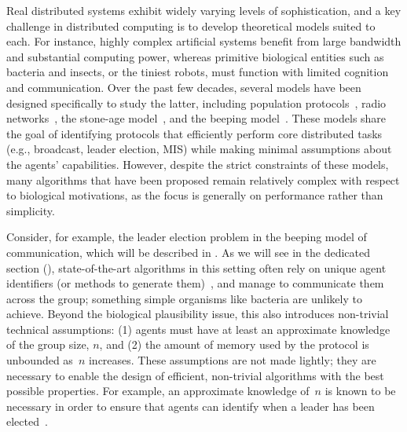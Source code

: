 \documentclass{article}
\newcommand{\inote}[1]{{\color{blue} ({\bf Isa:} #1)}}
\begin{document}
Real distributed systems exhibit widely varying levels of sophistication, and a key challenge in distributed computing is to develop theoretical models suited to each.
For instance, highly complex artificial systems benefit from large bandwidth and substantial computing power, whereas primitive biological entities such as bacteria and insects, or the tiniest robots, must function with limited cognition and communication. Over the past few decades, several models have been designed specifically to study the latter, including population protocols~\cite{AspnesR09}, radio networks~\cite{chlamtac_broadcasting_1985}, the stone-age model~\cite{emek_stone_2013}, and the beeping model~\cite{CornejoK10}. These models share the goal of identifying protocols that efficiently perform core distributed tasks (e.g., broadcast, leader election, MIS) while making minimal assumptions about the agents' capabilities.
However, despite the strict constraints of these models, many algorithms that have been proposed remain relatively complex with respect to biological motivations,
as the focus is generally on performance rather than simplicity.

Consider, for example, the leader election problem in the beeping model of communication, which will be described in .
As we will see in the dedicated section (), state-of-the-art algorithms in this setting often rely on unique agent identifiers (or methods to generate them)~\cite{DufoulonBB18,ForsterSW14,GhaffariH13,CzumajD19}, and manage to communicate them across the group; something simple organisms like bacteria are unlikely to achieve. Beyond the biological plausibility issue, this also introduces non-trivial technical assumptions: (1) agents must have at least an approximate knowledge of the group size, $n$, and (2) the amount of memory used by the protocol is unbounded as~$n$ increases.
These assumptions are not made lightly; they are necessary to enable the design of efficient, non-trivial algorithms with the best possible properties.
For example, an approximate knowledge of~$n$ is known to be necessary in order to ensure that agents can identify when a leader has been elected~\cite{itai_symmetry_1990}.
\end{document}
